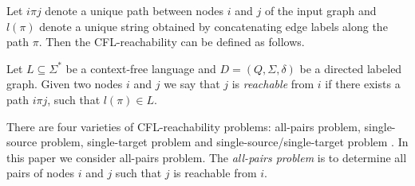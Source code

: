 Let $i\pi j$ denote a unique path between nodes $i$ and $j$ of the input graph and $l(\pi)$ denote a unique string obtained by concatenating edge labels along the path $\pi$. Then the CFL-reachability can be defined as follows.
\begin{definition}
Let $L \subseteq \Sigma^*$ be a context-free language and $D = (Q, \Sigma, \delta)$ be a directed labeled graph. Given two nodes $i$ and $j$ we say that $j$ is \textit{reachable} from $i$ if there exists a path $i \pi j$, such that $l(\pi) \in L$. 
\end{definition}
There are four varieties of CFL-reachability problems: all-pairs problem, single-source problem, single-target problem and single-source/single-target problem \cite{RepsBasic}. In this paper we consider all-pairs problem. The \textit{all-pairs problem} is to determine all pairs of nodes $i$ and $j$ such that $j$ is reachable from $i$. 



